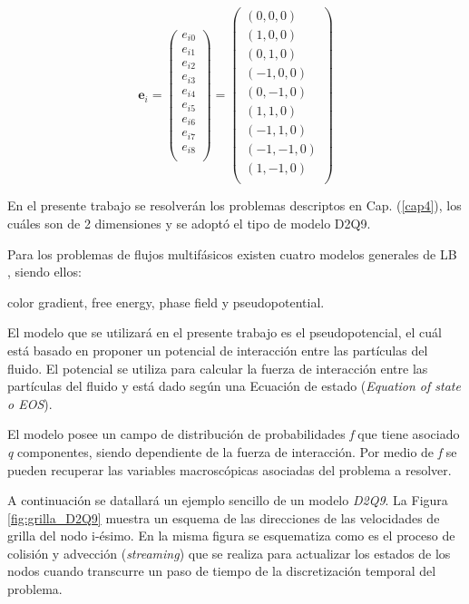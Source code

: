 \begin{equation}
{\mathbf{e}}_{i} =  
\left( \begin{array}{c} 
e_{i0} \\ e_{i1}\\ e_{i2}\\ e_{i3}\\ e_{i4}\\ e_{i5}\\
e_{i6}\\ e_{i7}\\ e_{i8}\\
\end{array}
\right) =
\left( \begin{array}{c} 
(0,0,0) \\ (1,0,0) \\ (0,1,0) \\(-1,0,0) \\ (0,-1,0) \\ (1,1,0) \\
(-1,1,0) \\ (-1,-1,0) \\ (1,-1,0)\\ 
\end{array}
\right) 
\label{eq:velgrilla}
\end{equation}




En el presente trabajo se resolverán los problemas descriptos en Cap. (\ref{cap4}), los cuáles son de 2 dimensiones y se adoptó el tipo de modelo D2Q9. 

Para los problemas de flujos multifásicos existen cuatro modelos generales de LB , siendo ellos:

\qquad \qquad color gradient, free energy, phase field y pseudopotential.

El modelo que se utilizará en el presente trabajo es el pseudopotencial, el cuál está basado en proponer un potencial de interacción entre las partículas del fluido. El potencial se utiliza para calcular la fuerza de interacción entre las partículas del fluido y está dado según una Ecuación de estado (\textit{Equation of state o EOS}). 

El modelo posee un campo de distribución de probabilidades \textit{f} que tiene asociado \textit{q} componentes, siendo dependiente de la fuerza de interacción. Por medio de \textit{f} se pueden recuperar las variables macroscópicas asociadas del problema a resolver.

A continuación se datallará un ejemplo sencillo de un modelo \textit{D2Q9}. La Figura \ref{fig:grilla_D2Q9} muestra un esquema de las direcciones de las velocidades de grilla del nodo i-ésimo. En la misma figura se esquematiza como  es el proceso de colisión y advección (\textit{streaming}) que se realiza para actualizar los estados de los nodos cuando transcurre un paso de tiempo de la discretización temporal del problema. 


